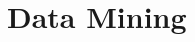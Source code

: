 \documentclass{beamer}
\newcommand\Wider[2][18mm]{%
    \makebox[\linewidth][c]{%
        \begin{minipage}{\dimexpr\textwidth+#1\relax}
            \raggedright#2
        \end{minipage}%
    }%
}
\begin{document}
%

\section{Data Mining}
\end{document}
